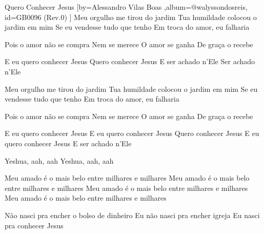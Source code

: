 \beginsong
{Quero Conhecer Jesus %
}[by={Alessandro Vilas Boas %
},album={@walyssondosreis},
id={GB0096 %
(Rev.0) %
}]
Meu orgulho me tirou do jardim
Tua humildade colocou o jardim em mim
Se eu vendesse tudo que tenho
Em troca do amor, eu falharia

Pois o amor não se compra
Nem se merece
O amor se ganha
De graça o recebe

E eu quero conhecer Jesus
Quero conhecer Jesus
E ser achado n'Ele
Ser achado n'Ele

Meu orgulho me tirou do jardim
Tua humildade colocou o jardim em mim
Se eu vendesse tudo que tenho
Em troca do amor, eu falharia

Pois o amor não se compra
Nem se merece
O amor se ganha
De graça o recebe

E eu quero conhecer Jesus
E eu quero conhecer Jesus
Quero conhecer Jesus
E eu quero conhecer Jesus
E ser achado n'Ele

Yeshua, aah, aah
Yeshua, aah, aah

Meu amado é o mais belo entre milhares e milhares
Meu amado é o mais belo entre milhares e milhares
Meu amado é o mais belo entre milhares e milhares
Meu amado é o mais belo entre milhares e milhares

Não nasci pra encher o bolso de dinheiro
Eu não nasci pra encher igreja
Eu nasci pra conhecer Jesus


